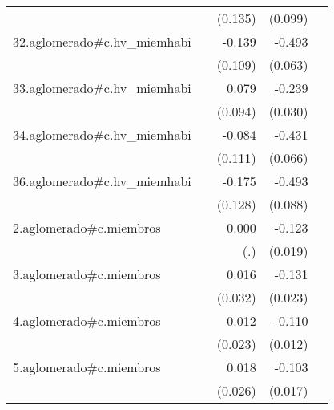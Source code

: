 {\begin{longtable}{l*{4}{D{.}{.}{-1}}}
            &                     &     (0.135)         &     (0.099)         &                     \\
\addlinespace
32.aglomerado#c.hv\_miemhabi&                     &      -0.139         &      -0.493\sym{***}&                     \\
            &                     &     (0.109)         &     (0.063)         &                     \\
\addlinespace
33.aglomerado#c.hv\_miemhabi&                     &       0.079         &      -0.239\sym{***}&                     \\
            &                     &     (0.094)         &     (0.030)         &                     \\
\addlinespace
34.aglomerado#c.hv\_miemhabi&                     &      -0.084         &      -0.431\sym{***}&                     \\
            &                     &     (0.111)         &     (0.066)         &                     \\
\addlinespace
36.aglomerado#c.hv\_miemhabi&                     &      -0.175         &      -0.493\sym{***}&                     \\
            &                     &     (0.128)         &     (0.088)         &                     \\
\addlinespace
2.aglomerado#c.miembros&                     &       0.000         &      -0.123\sym{***}&                     \\
            &                     &         (.)         &     (0.019)         &                     \\
\addlinespace
3.aglomerado#c.miembros&                     &       0.016         &      -0.131\sym{***}&                     \\
            &                     &     (0.032)         &     (0.023)         &                     \\
\addlinespace
4.aglomerado#c.miembros&                     &       0.012         &      -0.110\sym{***}&                     \\
            &                     &     (0.023)         &     (0.012)         &                     \\
\addlinespace
5.aglomerado#c.miembros&                     &       0.018         &      -0.103\sym{***}&                     \\
            &                     &     (0.026)         &     (0.017)         &                     \\

\end{longtable}}
